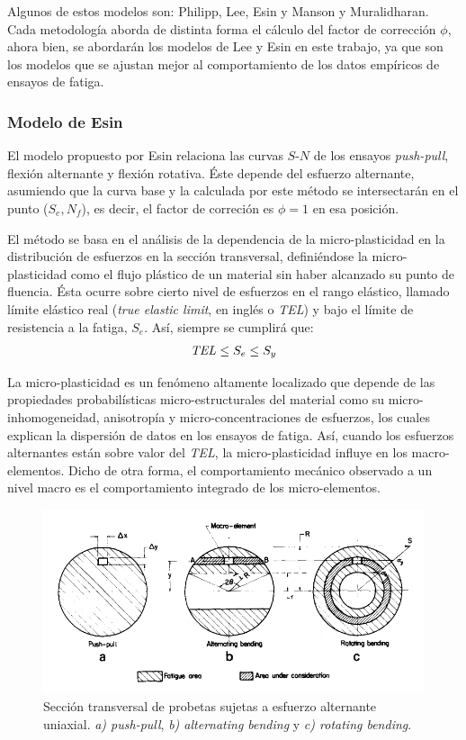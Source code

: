 Algunos de estos modelos son: Philipp, Lee, Esin y Manson y Muralidharan. Cada metodología aborda de distinta forma el cálculo del factor de corrección $\phi$, ahora bien, se abordarán los modelos de Lee y Esin en este trabajo, ya que son los modelos que se ajustan mejor al comportamiento de los datos empíricos de ensayos de fatiga.\cite{strzelecki2018analysis}

\subsubsection{Modelo de Esin}
El modelo propuesto por Esin \cite{esin1980method} relaciona las curvas $S$-$N$ de los ensayos \textit{push-pull}, flexión alternante y flexión rotativa. Éste depende del esfuerzo alternante, asumiendo que la curva base y la calculada por este método se intersectarán en el punto ($S_e,N_f$), es decir, el factor de correción es $\phi=1$ en esa posición. 

El método se basa en el análisis de la dependencia de la micro-plasticidad en la distribución de esfuerzos en la sección transversal, definiéndose la micro-plasticidad como el flujo plástico de un material sin haber alcanzado su punto de fluencia. Ésta ocurre sobre cierto nivel de esfuerzos en el rango elástico, llamado límite elástico real (\textit{true elastic limit}, en inglés o \textit{TEL}) y bajo el límite de resistencia a la fatiga, $S_e$. Así, siempre se cumplirá que:
\begin{align*}
	\text{\textit{TEL}} \leq S_e \leq S_y
\end{align*}

La micro-plasticidad es un fenómeno altamente localizado que depende de las propiedades probabilísticas micro-estructurales del material como su micro-inhomogeneidad, anisotropía y micro-concentraciones de esfuerzos, los cuales explican la dispersión de datos en los ensayos de fatiga. Así, cuando los esfuerzos alternantes están sobre valor del  \textit{TEL}, la micro-plasticidad influye en los macro-elementos. Dicho de otra forma, el comportamiento mecánico observado a un nivel macro es el comportamiento integrado de los micro-elementos.

\begin{figure}[h]
\centering
\includegraphics[scale=1]{Imagenes/affectedarea_fatigue.pdf}
\caption{Sección transversal de probetas sujetas a esfuerzo alternante uniaxial. \textit{a) push-pull}, \textit{b) alternating bending} y \textit{c) rotating bending}. \cite{esin1980method}}
\label{fig:affar_fat}
\end{figure}

